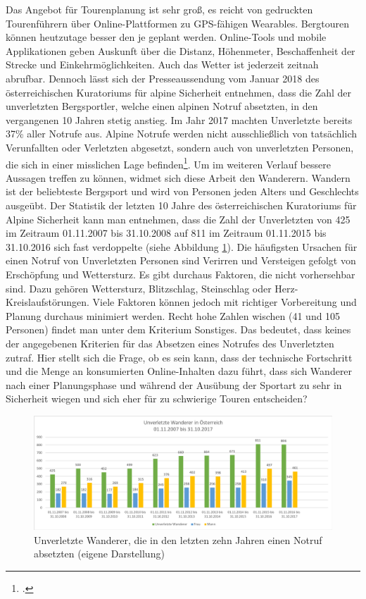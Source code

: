 Das Angebot für Tourenplanung ist sehr groß, es reicht von gedruckten Tourenführern über Online-Plattformen zu GPS-fähigen Wearables. Bergtouren können heutzutage besser den je geplant werden. Online-Tools und mobile Applikationen geben Auskunft über die Distanz, Höhenmeter, Beschaffenheit der Strecke und Einkehrmöglichkeiten. Auch das Wetter ist jederzeit zeitnah abrufbar. Dennoch lässt sich der Presseaussendung vom Januar 2018 des österreichischen Kuratoriums für alpine Sicherheit entnehmen, dass die Zahl der unverletzten Bergsportler, welche einen alpinen Notruf absetzten, in den vergangenen 10 Jahren stetig anstieg. Im Jahr 2017 machten Unverletzte bereits 37\% aller Notrufe aus. Alpine Notrufe werden nicht ausschließlich von tatsächlich Verunfallten oder Verletzten abgesetzt, sondern auch von unverletzten Personen, die sich in einer misslichen Lage befinden\footcite{kurasi}.
Um im weiteren Verlauf bessere Aussagen treffen zu können, widmet sich diese Arbeit den Wanderern. Wandern ist der beliebteste Bergsport und wird von Personen jeden Alters und Geschlechts ausgeübt.
Der Statistik der letzten 10 Jahre des österreichischen Kuratoriums für Alpine Sicherheit kann man entnehmen, dass die Zahl der Unverletzten von 425 im Zeitraum 01.11.2007 bis 31.10.2008 auf 811 im Zeitraum 01.11.2015 bis 31.10.2016 sich fast verdoppelte (siehe Abbildung \ref{fig:uwan}). Die häufigsten Ursachen für einen Notruf von Unverletzten Personen sind {\glqq Verirren und Versteigen\grqq} gefolgt von {\glqq Erschöpfung\grqq}  und {\glqq Wettersturz\grqq}. Es gibt durchaus Faktoren, die nicht vorhersehbar sind. Dazu gehören Wettersturz, Blitzschlag, Steinschlag oder Herz-Kreislaufstörungen. Viele Faktoren können jedoch mit richtiger Vorbereitung und Planung durchaus minimiert werden. Recht hohe Zahlen wischen (41 und 105 Personen) findet man unter dem Kriterium {\glqq Sonstiges\grqq}. Das bedeutet, dass keines der angegebenen Kriterien für das Absetzen eines Notrufes des Unverletzten zutraf. Hier stellt sich die Frage, ob es sein kann, dass der technische Fortschritt und die Menge an konsumierten Online-Inhalten dazu führt, dass sich Wanderer nach einer Planungsphase und während der Ausübung der Sportart zu sehr in Sicherheit wiegen und sich eher für zu schwierige Touren entscheiden?
\begin{figure}
	\centering
\includegraphics[width=1\linewidth]{content/uwan}
\caption{Unverletzte Wanderer, die in den letzten zehn Jahren einen Notruf absetzten (eigene Darstellung)}
\label{fig:uwan}
\end{figure}



